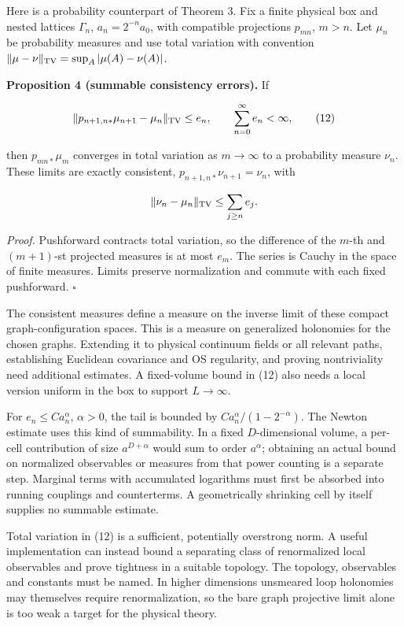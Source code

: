 \documentclass[11pt,a4paper]{article}
\begin{document}
Here is a probability counterpart of Theorem 3. Fix a finite physical
box and nested lattices \(\Gamma_n\), \(a_n=2^{-n}a_0\), with compatible
projections \(p_{mn}\), \(m>n\). Let \(\mu_n\) be probability measures
and use total variation with convention
\(\|\mu-\nu\|_{\rm TV}=\sup_A|\mu(A)-\nu(A)|\).

\textbf{Proposition 4 (summable consistency errors).} If

\[\|p_{n+1,n*}\mu_{n+1}-\mu_n\|_{\rm TV}\le e_n,
\qquad \sum_{n=0}^\infty e_n<\infty, \tag{12}\]

then \(p_{mn*}\mu_m\) converges in total variation as \(m\to\infty\) to
a probability measure \(\nu_n\). These limits are exactly consistent,
\(p_{n+1,n*}\nu_{n+1}=\nu_n\), with

\[\|\nu_n-\mu_n\|_{\rm TV}\le\sum_{j\ge n}e_j.\]

\emph{Proof.} Pushforward contracts total variation, so the difference
of the \(m\)-th and \((m+1)\)-st projected measures is at most \(e_m\).
The series is Cauchy in the space of finite measures. Limits preserve
normalization and commute with each fixed pushforward. \(\square\)

The consistent measures define a measure on the inverse limit of these
compact graph-configuration spaces. This is a measure on generalized
holonomies for the chosen graphs. Extending it to physical continuum
fields or all relevant paths, establishing Euclidean covariance and OS
regularity, and proving nontriviality need additional estimates. A
fixed-volume bound in (12) also needs a local version uniform in the box
to support \(L\to\infty\).

For \(e_n\le C a_n^\alpha\), \(\alpha>0\), the tail is bounded by
\(Ca_n^\alpha/(1-2^{-\alpha})\). The Newton estimate uses this kind of
summability. In a fixed \(D\)-dimensional volume, a per-cell
contribution of size \(a^{D+\alpha}\) would sum to order \(a^\alpha\);
obtaining an actual bound on normalized observables or measures from
that power counting is a separate step. Marginal terms with accumulated
logarithms must first be absorbed into running couplings and
counterterms. A geometrically shrinking cell by itself supplies no
summable estimate.

Total variation in (12) is a sufficient, potentially overstrong norm. A
useful implementation can instead bound a separating class of
renormalized local observables and prove tightness in a suitable
topology. The topology, observables and constants must be named. In
higher dimensions unsmeared loop holonomies may themselves require
renormalization, so the bare graph projective limit alone is too weak a
target for the physical theory.
\end{document}
